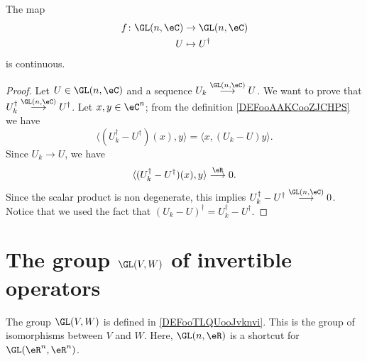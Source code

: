 \begin{lemma}        \label{LEMooZILJooFfDEAF}
	The map
	\begin{equation}
		\begin{aligned}
			f\colon \GL(n,\eC) & \to \GL(n,\eC)   \\
			U                  & \mapsto U^{\dag}
		\end{aligned}
	\end{equation}
	is continuous.
\end{lemma}

\begin{proof}
	Let \( U\in\GL(n,\eC)\) and a sequence \( U_k\stackrel{\GL(n,\eC)}{\longrightarrow}U\). We want to prove that \( U_k^{\dag}\stackrel{\GL(n,\eC)}{\longrightarrow}U^{\dag}\). Let \( x,y\in \eC^n\); from the definition \ref{DEFooAAKCooZJCHPS} we have
	\begin{equation}
		\langle (U_k^{\dag}-U^{\dag})(x),y \rangle =\langle x, (U_k-U)y \rangle .
	\end{equation}
	Since \( U_k\to U\), we have
	\begin{equation}
		\langle (U_k^{\dag}-U^{\dag})(x),y \rangle \stackrel{\eR}{\longrightarrow}0.
	\end{equation}
	Since the scalar product is non degenerate, this implies \( U_k^{\dag}-U^{\dag}\stackrel{\GL(n,\eC)}{\longrightarrow}0\). Notice that we used the fact that \( (U_k-U)^{\dag}=U_k^{\dag}-U^{\dag}\).
\end{proof}

\section{The group \texorpdfstring{$ \GL(V,W)$}{GL(V)} of invertible operators}


The group \( \GL(V,W)\) is defined in \ref{DEFooTLQUooJvknvi}. This is the group of isomorphisms between \( V\) and \( W\). Here, \( \GL(n,\eR)\) is a shortcut for \( \GL(\eR^n, \eR^n)\).

